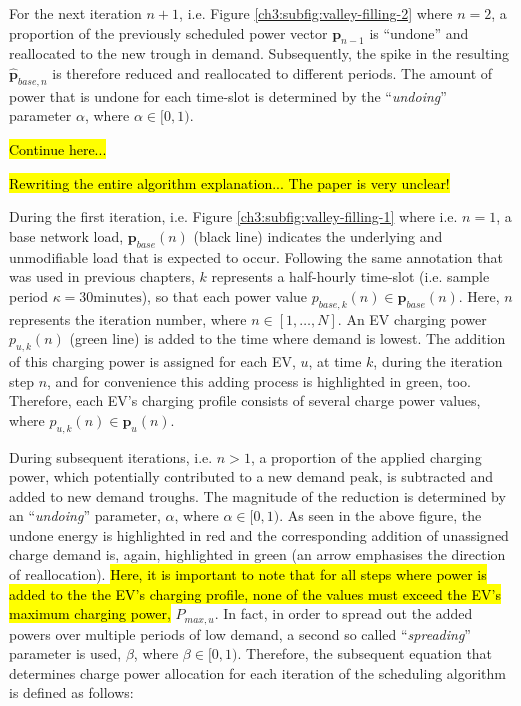 

For the next iteration $n+1$, i.e. Figure \ref{ch3:subfig:valley-filling-2} where $n=2$, a proportion of the previously scheduled power vector $\textbf{p}_{n-1}$ is ``undone'' and reallocated to the new trough in demand.
Subsequently, the spike in the resulting $\hat{\textbf{p}}_{base, n}$ is therefore reduced and reallocated to different periods.
The amount of power that is undone for each time-slot is determined by the ``\textit{undoing}'' parameter $\alpha$, where $\alpha \in [0, 1)$.

\hl{Continue here...}

\hl{Rewriting the entire algorithm explanation... The paper is very unclear!}

During the first iteration, i.e. Figure \ref{ch3:subfig:valley-filling-1} where i.e. $n=1$, a base network load, $\textbf{p}_{base}(n)$ (black line) indicates the underlying and unmodifiable load that is expected to occur.
Following the same annotation that was used in previous chapters, $k$ represents a half-hourly time-slot (i.e. sample period $\kappa = 30\text{minutes}$), so that each power value $p_{base,k}(n) \in \textbf{p}_{base}(n)$.
Here, $n$ represents the iteration number, where $n \in [1, \dots, N]$.
An EV charging power $p_{u,k}(n)$ (green line) is added to the time where demand is lowest.
The addition of this charging power is assigned for each EV, $u$, at time $k$, during the iteration step $n$, and for convenience this adding process is highlighted in green, too.
Therefore, each EV's charging profile consists of several charge power values, where $p_{u,k}(n) \in \textbf{p}_u(n)$.


During subsequent iterations, i.e. $n>1$, a proportion of the applied charging power, which potentially contributed to a new demand peak, is subtracted and added to new demand troughs.
The magnitude of the reduction is determined by an ``\textit{undoing}'' parameter, $\alpha$, where $\alpha \in [0, 1)$.
As seen in the above figure, the undone energy is highlighted in red and the corresponding addition of unassigned charge demand is, again, highlighted in green (an arrow emphasises the direction of reallocation).
\hl{Here, it is important to note that for all steps where power is added to the the EV's charging profile, none of the values must exceed the EV's maximum charging power, }$P_{max,u}$.
In fact, in order to spread out the added powers over multiple periods of low demand, a second so called ``\textit{spreading}'' parameter is used, $\beta$, where $\beta \in [0, 1)$.
Therefore, the subsequent equation that determines charge power allocation for each iteration of the scheduling algorithm is defined as follows:

